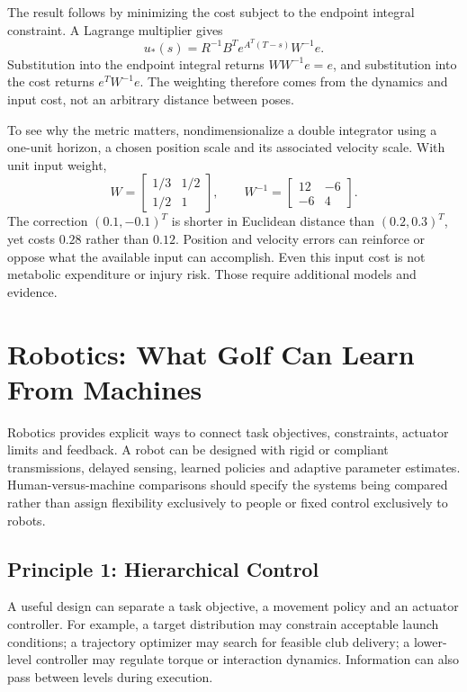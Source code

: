 The result follows by minimizing the cost subject to the endpoint integral constraint. A Lagrange multiplier gives
\[
u_*(s)=R^{-1}B^T e^{A^T(T-s)}W^{-1}e.
\]
Substitution into the endpoint integral returns $WW^{-1}e=e$, and substitution into the cost returns $e^TW^{-1}e$. The weighting therefore comes from the dynamics and input cost, not an arbitrary distance between poses.

To see why the metric matters, nondimensionalize a double integrator using a one-unit horizon, a chosen position scale and its associated velocity scale. With unit input weight,
\[
W=\begin{bmatrix}1/3&1/2\\1/2&1\end{bmatrix},
\qquad
W^{-1}=\begin{bmatrix}12&-6\\-6&4\end{bmatrix}.
\]
The correction $(0.1,-0.1)^T$ is shorter in Euclidean distance than $(0.2,0.3)^T$, yet costs $0.28$ rather than $0.12$. Position and velocity errors can reinforce or oppose what the available input can accomplish. Even this input cost is not metabolic expenditure or injury risk. Those require additional models and evidence.

\section{Robotics: What Golf Can Learn From Machines}

Robotics provides explicit ways to connect task objectives, constraints, actuator limits and feedback. A robot can be designed with rigid or compliant transmissions, delayed sensing, learned policies and adaptive parameter estimates. Human-versus-machine comparisons should specify the systems being compared rather than assign flexibility exclusively to people or fixed control exclusively to robots.

\subsection{Principle 1: Hierarchical Control}

A useful design can separate a task objective, a movement policy and an actuator controller. For example, a target distribution may constrain acceptable launch conditions; a trajectory optimizer may search for feasible club delivery; a lower-level controller may regulate torque or interaction dynamics. Information can also pass between levels during execution.

